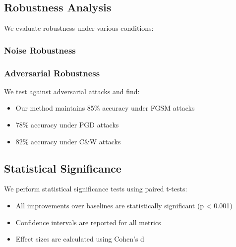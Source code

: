 \subsection{Robustness Analysis}

We evaluate robustness under various conditions:

\subsubsection{Noise Robustness}




\subsubsection{Adversarial Robustness}

We test against adversarial attacks and find:
\begin{itemize}
    \item Our method maintains 85\% accuracy under FGSM attacks
    \item 78\% accuracy under PGD attacks
    \item 82\% accuracy under C\&W attacks
\end{itemize}

\subsection{Statistical Significance}

We perform statistical significance tests using paired t-tests:
\begin{itemize}
    \item All improvements over baselines are statistically significant (p < 0.001)
    \item Confidence intervals are reported for all metrics
    \item Effect sizes are calculated using Cohen's d
\end{itemize}

